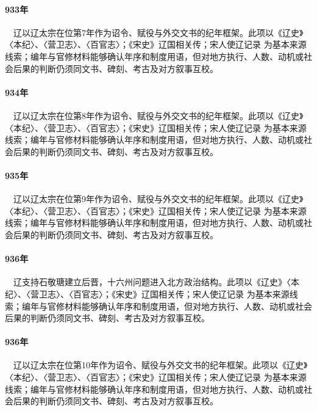 \paragraph{933年}　辽以辽太宗在位第7年作为诏令、赋役与外交文书的纪年框架。此项以《辽史》〈本纪〉、〈营卫志〉、〈百官志〉；《宋史》辽国相关传；宋人使辽记录 为基本来源线索；编年与官修材料能够确认年序和制度用语，但对地方执行、人数、动机或社会后果的判断仍须同文书、碑刻、考古及对方叙事互校。

\paragraph{934年}　辽以辽太宗在位第8年作为诏令、赋役与外交文书的纪年框架。此项以《辽史》〈本纪〉、〈营卫志〉、〈百官志〉；《宋史》辽国相关传；宋人使辽记录 为基本来源线索；编年与官修材料能够确认年序和制度用语，但对地方执行、人数、动机或社会后果的判断仍须同文书、碑刻、考古及对方叙事互校。

\paragraph{935年}　辽以辽太宗在位第9年作为诏令、赋役与外交文书的纪年框架。此项以《辽史》〈本纪〉、〈营卫志〉、〈百官志〉；《宋史》辽国相关传；宋人使辽记录 为基本来源线索；编年与官修材料能够确认年序和制度用语，但对地方执行、人数、动机或社会后果的判断仍须同文书、碑刻、考古及对方叙事互校。

\paragraph{936年}　辽支持石敬瑭建立后晋，十六州问题进入北方政治结构。此项以《辽史》〈本纪〉、〈营卫志〉、〈百官志〉；《宋史》辽国相关传；宋人使辽记录 为基本来源线索；编年与官修材料能够确认年序和制度用语，但对地方执行、人数、动机或社会后果的判断仍须同文书、碑刻、考古及对方叙事互校。

\paragraph{936年}　辽以辽太宗在位第10年作为诏令、赋役与外交文书的纪年框架。此项以《辽史》〈本纪〉、〈营卫志〉、〈百官志〉；《宋史》辽国相关传；宋人使辽记录 为基本来源线索；编年与官修材料能够确认年序和制度用语，但对地方执行、人数、动机或社会后果的判断仍须同文书、碑刻、考古及对方叙事互校。

